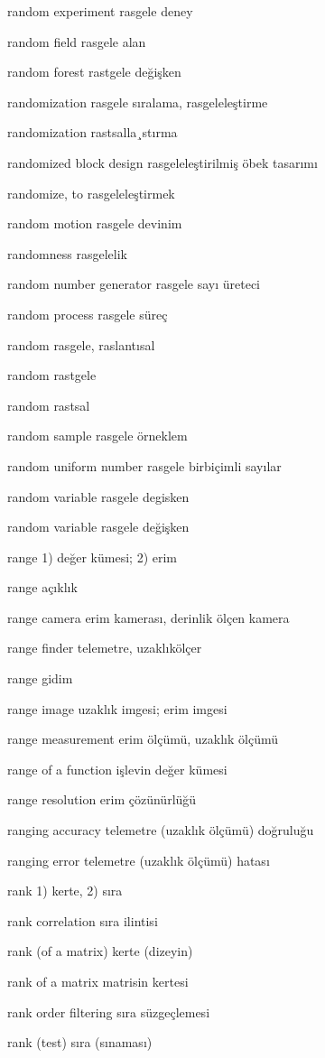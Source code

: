 \documentclass[12pt,fleqn]{article}\usepackage{../../common}
\begin{document}
random experiment rasgele deney

random field rasgele alan

random forest rastgele değişken

randomization rasgele sıralama, rasgeleleştirme

randomization rastsalla¸stırma

randomized block design rasgeleleştirilmiş öbek tasarımı

randomize, to rasgeleleştirmek

random motion rasgele devinim

randomness rasgelelik

random number generator rasgele sayı üreteci

random process rasgele süreç

random rasgele, raslantısal

random rastgele

random rastsal

random sample rasgele örneklem

random uniform number rasgele birbiçimli sayılar

random variable rasgele degisken

random variable rasgele değişken

range 1) değer kümesi; 2) erim

range açıklık

range camera erim kamerası, derinlik ölçen kamera

range finder telemetre, uzaklıkölçer

range gidim

range image uzaklık imgesi; erim imgesi

range measurement erim ölçümü, uzaklık ölçümü

range of a function işlevin değer kümesi

range resolution erim çözünürlüğü

ranging accuracy telemetre (uzaklık ölçümü) doğruluğu

ranging error telemetre (uzaklık ölçümü) hatası

rank 1) kerte, 2) sıra

rank correlation sıra ilintisi

rank (of a matrix) kerte (dizeyin)

rank of a matrix matrisin kertesi

rank order filtering sıra süzgeçlemesi

rank (test) sıra (sınaması)
\end{document}
